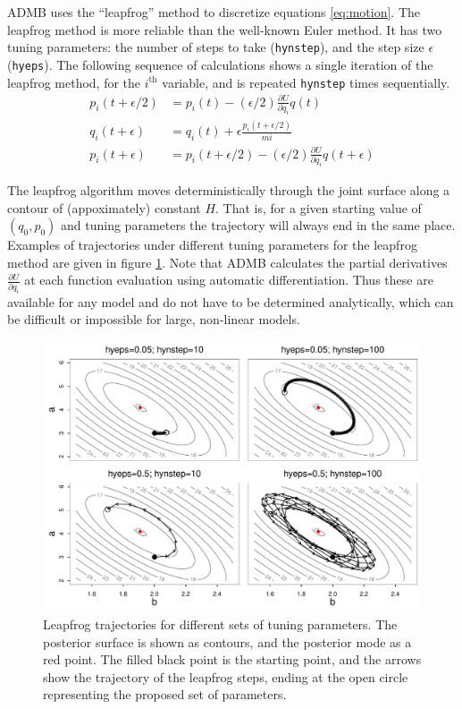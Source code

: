 \documentclass{article}\usepackage[]{graphicx}\usepackage[]{color}
\begin{document}
ADMB uses the ``leapfrog'' method to discretize equations
\eqref{eq:motion}. The leapfrog method is more reliable than the well-known
Euler method. It has two tuning parameters: the number of steps to
take (\texttt{hynstep}), and the step size $\epsilon$ (\texttt{hyeps}). The
following sequence of calculations shows a single iteration of the leapfrog
method, for the $i^{\text{th}}$ variable, and is repeated \texttt{hynstep}
times sequentially.
\begin{align*}
  p_i(t+\epsilon/2)&=p_i(t)-(\epsilon/2)\frac{\partial{U}}{\partial{q_i}}q(t)\\
  q_i(t+\epsilon)&=q_i(t)+\epsilon \frac{p_i(t+\epsilon/2)}{mi}\\
  p_i(t+\epsilon)&=p_i(t+\epsilon/2)-(\epsilon/2)\frac{\partial{U}}{\partial{q_i}}q(t+\epsilon)
\end{align*}

The leapfrog algorithm moves deterministically through the joint surface
along a contour of (appoximately) constant $H$. That is, for a given
starting value of $(q_0,p_0)$ and tuning parameters the trajectory will
always end in the same place. Examples of trajectories under different
tuning parameters for the leapfrog method are given in figure
\ref{fig:hybrid_grid_trace}. Note that ADMB calculates the partial
derivatives $\frac{\partial{U}}{\partial{q_i}}$ at each function evaluation
using automatic differentiation. Thus these are available for any model and
do not have to be determined analytically, which can be difficult or
impossible for large, non-linear models.

\begin{figure}[h]
  \centering
  \includegraphics[width=5in]{../plots/hybrid_grid_trace.pdf}
  \caption{Leapfrog trajectories for different sets of tuning
    parameters. The posterior surface is shown as contours, and the
    posterior mode as a red point. The filled black point is the starting
    point, and the arrows show the trajectory of the leapfrog steps, ending
    at the open circle representing the proposed set of parameters.}
  \label{fig:hybrid_grid_trace}
\end{figure}
\end{document}

